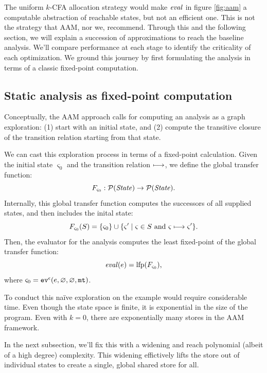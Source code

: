 \documentclass[preprint,onecolumn,9pt]{sigplanconf} %
\newcommand{\naive}{na\"ive}
\begin{document}
The uniform $k$-CFA allocation strategy would make $\eval$ in figure
\ref{fig:aam} a computable abstraction of reachable states, but not an
efficient one. This is not the strategy that AAM, nor we, recommend. Through
this and the following section, we will explain a succession of approximations
to reach the baseline analysis.  We'll compare performance at each stage to
identify the criticality of each optimization. 
%
We ground this journey by first formulating the analysis in terms of a classic
fixed-point computation.


\subsection{Static analysis as fixed-point computation}
\label{sec:fixpoint}

Conceptually, the AAM approach calls for computing an analysis as a graph
exploration: (1) start with an initial state, and (2) compute the transitive
closure of the transition relation starting from that state.

We can cast this exploration process in terms of a fixed-point calculation.
%
Given the initial state $\varsigma_0$ and the transition relation $\machstep$,
we define the global transfer function:
\begin{equation*}
 F_{\varsigma_0} : \mathcal{P}(\mathit{State}) \to \mathcal{P}(\mathit{State})
 \text.
\end{equation*}
Internally, this global transfer function computes the successors of all supplied states, and then includes the inital state:
\begin{equation*}
  F_{\varsigma_0}(S) = \{ \varsigma_0 \} \cup \{ \varsigma' \mathrel{|} \varsigma \in S \text{ and } \varsigma \machstep \varsigma' \}\text. 
\end{equation*}
Then, the evaluator for the analysis computes the least fixed-point of the global transfer function:
\begin{equation*}
 \eval(e) = \mathrm{lfp}(F_{\varsigma_0})\text{,}
\end{equation*}
where $\varsigma_0 = \ev[^\mtcntr]{e, \varnothing, \varnothing, \kmt}$.


To conduct this \naive{} exploration on the \Church{} example would require
considerable time.  Even though the state space is finite, it is exponential in
the size of the program.  Even with $k = 0$, there are exponentially many
stores in the AAM framework.

In the next subsection, we'll fix this with a widening and reach polynomial
(albeit of a high degree) complexity.
%
This widening effictively lifts the store out of individual states to create
a single, global shared store for all.
\end{document}
